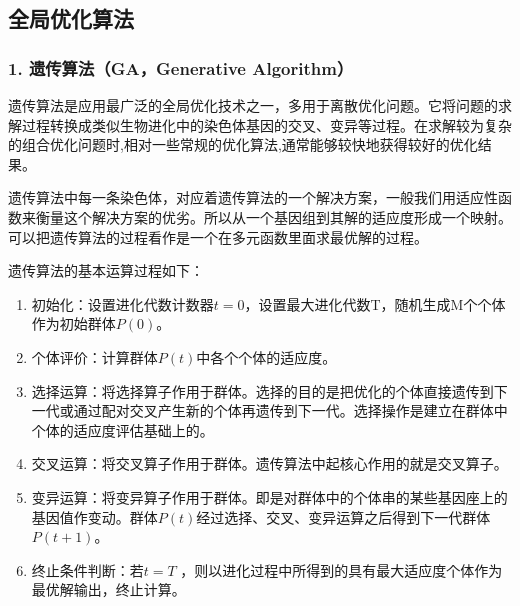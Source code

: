 \documentclass[letterpaper,10pt,english]{sphinxmanual}
\begin{document}
\sphinxstepscope


\subsection{全局优化算法}
\label{\detokenize{_u7b80_u4ecb/_u6838_u5fc3_u8bbe_u8ba1_u4f18_u5316_u7b97_u6cd5/_u5168_u5c40_u641c_u7d22_u4f18_u5316_u6a21_u5757/_u5168_u5c40_u4f18_u5316_u7b97_u6cd5:id1}}\label{\detokenize{_u7b80_u4ecb/_u6838_u5fc3_u8bbe_u8ba1_u4f18_u5316_u7b97_u6cd5/_u5168_u5c40_u641c_u7d22_u4f18_u5316_u6a21_u5757/_u5168_u5c40_u4f18_u5316_u7b97_u6cd5::doc}}

\subsubsection{1. 遗传算法（GA，Generative Algorithm）}
\label{\detokenize{_u7b80_u4ecb/_u6838_u5fc3_u8bbe_u8ba1_u4f18_u5316_u7b97_u6cd5/_u5168_u5c40_u641c_u7d22_u4f18_u5316_u6a21_u5757/_u5168_u5c40_u4f18_u5316_u7b97_u6cd5:ga-generative-algorithm}}
\sphinxAtStartPar
遗传算法是应用最广泛的全局优化技术之一，多用于离散优化问题。它将问题的求解过程转换成类似生物进化中的染色体基因的交叉、变异等过程。在求解较为复杂的组合优化问题时,相对一些常规的优化算法,通常能够较快地获得较好的优化结果。

\sphinxAtStartPar
遗传算法中每一条染色体，对应着遗传算法的一个解决方案，一般我们用适应性函数来衡量这个解决方案的优劣。所以从一个基因组到其解的适应度形成一个映射。可以把遗传算法的过程看作是一个在多元函数里面求最优解的过程。

\sphinxAtStartPar


\sphinxAtStartPar
{}



\sphinxAtStartPar
遗传算法的基本运算过程如下：
\begin{enumerate}
%
\item {} 
\sphinxAtStartPar
初始化：设置进化代数计数器\(t=0\)，设置最大进化代数T，随机生成M个个体作为初始群体\(P(0)\)。

\item {} 
\sphinxAtStartPar
个体评价：计算群体\(P(t)\)中各个个体的适应度。

\item {} 
\sphinxAtStartPar
选择运算：将选择算子作用于群体。选择的目的是把优化的个体直接遗传到下一代或通过配对交叉产生新的个体再遗传到下一代。选择操作是建立在群体中个体的适应度评估基础上的。

\item {} 
\sphinxAtStartPar
交叉运算：将交叉算子作用于群体。遗传算法中起核心作用的就是交叉算子。

\item {} 
\sphinxAtStartPar
变异运算：将变异算子作用于群体。即是对群体中的个体串的某些基因座上的基因值作变动。群体\(P(t)\)经过选择、交叉、变异运算之后得到下一代群体\(P(t+1)\)。

\item {} 
\sphinxAtStartPar
终止条件判断：若\(t=T\) ，则以进化过程中所得到的具有最大适应度个体作为最优解输出，终止计算。

\end{enumerate}
\end{document}
